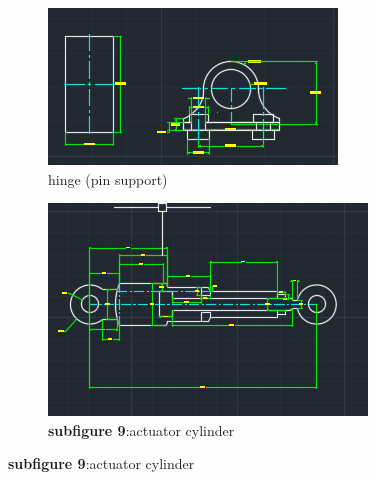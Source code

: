 \documentclass[../../main]{subfiles}
\begin{document}
\begin{figure}[h]
\centering
\begin{subfigure}[b]{0.45\textwidth}
  \includegraphics[width=\textwidth]{img/image077.png}
  \caption{hinge (pin support)}
\end{subfigure}
\hfill
\begin{subfigure}[b]{0.45\textwidth}
  \includegraphics[width=\textwidth]{img/image079.png}
  \caption{\textbf{subfigure 9}:actuator cylinder}
\end{subfigure}
\end{figure}
\end{document}
